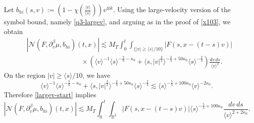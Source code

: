 \documentclass[reqno,11pt]{amsart}
\numberwithin{equation}{section}
\begin{document}
Let $b_{hi}(s,v):=\left(1-\chi\left(\frac{|v|}{\langle s\rangle}\right)\right)v^{\otimes k}.$
	Using the large-velocity version of the symbol bound, namely
	\eqref{q3-largev}, and arguing as in the proof of \eqref{x103}, we obtain
	\begin{equation}\label{largev-start}
	\begin{split}
		&\left|\mathcal N(F,\partial_v^\beta\mu,b_{hi})(t,x)\right|\lesssim M_T\int_0^t
		\int_{\{|v|\ge \langle s\rangle/10\}}
		|F(s,x-(t-s)v)|\\
		&\qquad\qquad\qquad\qquad\times\left(\langle v\rangle^{-1}
		\langle s\rangle^{-\frac76-\kappa_0}+
		\langle s,|v|^{\frac32}\rangle^{-\frac23+50\kappa_0}
		\langle s\rangle^{-\frac23}\right)
		\frac{dv\,ds}{\langle v\rangle^2}.
	\end{split}
	\end{equation}
	On the region $|v|\ge \langle s\rangle/10$, we have
	\begin{equation*}
		\langle v\rangle^{-1}
		\langle s\rangle^{-\frac76-\kappa_0}
		+
		\langle s,|v|^{\frac32}\rangle^{-\frac23+50\kappa_0}
		\langle s\rangle^{-\frac23}
		\lesssim
		\langle s\rangle^{-\frac53+100\kappa_0}
		\langle v\rangle^{-2\kappa_0}.
	\end{equation*}
	Therefore \eqref{largev-start} implies
	\begin{equation}\label{q6}
		\left|
		\mathcal N(F,\partial_v^\beta\mu,b_{hi})(t,x)\right|
		\lesssim
		M_T\int_0^t\int_{\mathbb R^2}|F(s,x-(t-s)v)|\langle s\rangle^{-\frac53+100\kappa_0}
		\frac{dv\,ds}{\langle v\rangle^{2+2\kappa_0}}.
	\end{equation}
\end{document}
